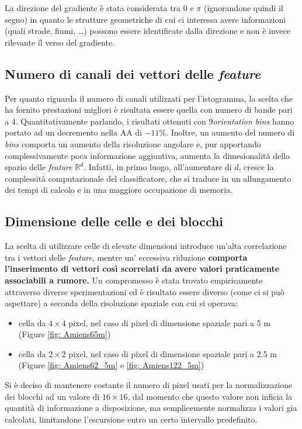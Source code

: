 La direzione del gradiente è stata considerata tra $0$ e $\pi$ (ignorandone quindi il segno) in quanto le strutture geometriche di cui ci interessa avere informazioni (quali strade, fiumi, \ldots) possono essere identificate dalla direzione e non è invece rilevante il verso del gradiente.

\subsection{Numero di canali dei vettori delle \emph{feature}}
Per quanto riguarda il numero di canali utilizzati per l'istogramma, la scelta che ha fornito prestazioni migliori è risultata essere quella con numero di bande pari a 4. Quantitativamente parlando, i risultati ottenuti con $9$\emph{orientation bins} hanno portato ad un decremento nella AA di $-11\%$. Inoltre, un aumento del numero di \emph{bins} comporta un aumento della risoluzione angolare e, pur apportando complessivamente poca informazione aggiuntiva,  aumenta la dimesionalità dello spazio delle \emph{feature} $\mathbb{R}^d$. Infatti, in primo luogo, all'aumentare di $d$, cresce la complessità computazionale del classificatore, che si traduce in un allungamento dei tempi di calcolo e in una maggiore occupazione di memoria.

\subsection{Dimensione delle celle e dei blocchi}
La scelta di utilizzare celle di elevate dimensioni introduce un'alta correlazione tra i vettori delle \emph{feature}, mentre un' eccessiva riduzione \textbf{comporta l'inserimento di vettori così scorrelati da avere valori praticamente associabili a rumore.} Un compromesso  è stata trovato empiricamente attraverso diverse sperimentazioni ed è risultato essere diverso (come ci si può aspettare) a seconda della risoluzione spaziale con cui si operava:
\begin{itemize}
\item cella da $4\times 4$ pixel, nel caso di pixel di dimensione spaziale pari a 5 m (Figure \ref{fig: Amiens65m})
\item cella da $2 \times 2$ pixel, nel caso di pixel di dimensione spaziale pari a 2.5 m (Figure \ref{fig: Amiens62_5m} e \ref{fig: Amiens122_5m})
\end{itemize}

Si è deciso di mantenere costante il numero di pixel usati per la normalizzazione dei blocchi ad un valore di $16\times16$, dal momento che questo valore non inficia la quantità di informazione a disposizione, ma semplicemente normalizza i valori gia calcolati, limitandone l'escursione entro un certo intervallo predefinito.

